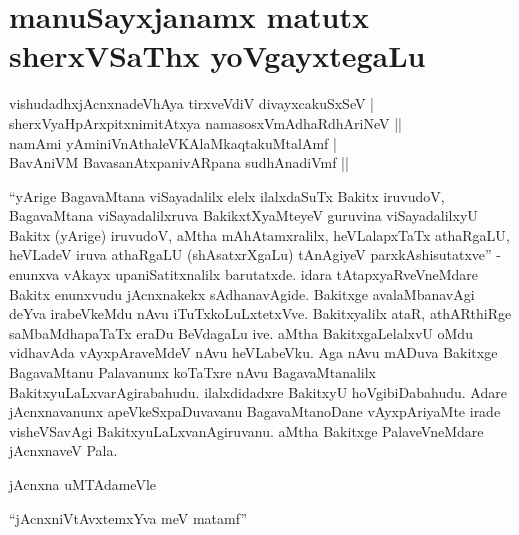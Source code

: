 \chapter{manuSayxjanamx matutx sherxVSaThx yoVgayxtegaLu}\label{chap9}

\begin{shloka}
vishudadhxjAcnxnadeVhAya tirxveVdiV divayxcakuSxSeV |\\
sherxVyaHpArxpitxnimitAtxya namasosxVmAdhaRdhAriNeV ||\\
namAmi yAminiVnAthaleVKAlaMkaqtakuMtalAmf |\\
BavAniVM BavasanAtxpanivARpana sudhAnadiVmf ||
\end{shloka}

``yArige BagavaMtana viSayadalilx elelx ilalxdaSuTx Bakitx iruvudoV, BagavaMtana viSayadalilxruva BakikxtXyaMteyeV guruvina viSayadalilxyU Bakitx (yArige) iruvudoV, aMtha mAhAtamxralilx, heVLalapxTaTx athaRgaLU, heVLadeV iruva athaRgaLU (shAsatxrXgaLu) tAnAgiyeV parxkAshisutatxve'' - enunxva vAkayx upaniSatitxnalilx barutatxde. idara tAtapxyaRveVneMdare Bakitx enunxvudu jAcnxnakekx sAdhanavAgide. Bakitxge avalaMbanavAgi deYva irabeVkeMdu nAvu iTuTxkoLuLxtetxVve. Bakitxyalilx ataR, athARthiRge saMbaMdhapaTaTx eraDu BeVdagaLu ive. aMtha BakitxgaLelalxvU oMdu vidhavAda vAyxpAraveMdeV nAvu heVLabeVku. Aga nAvu mADuva Bakitxge BagavaMtanu Palavanunx koTaTxre nAvu BagavaMtanalilx BakitxyuLaLxvarAgirabahudu. ilalxdidadxre BakitxyU hoVgibiDabahudu. Adare jAcnxnavanunx apeVkeSxpaDuvavanu BagavaMtanoDane vAyxpAriyaMte irade visheVSavAgi BakitxyuLaLxvanAgiruvanu. aMtha Bakitxge PalaveVneMdare jAcnxnaveV Pala.

jAcnxna uMTAdameVle

\begin{shloka}
``jAcnxniVtAvxtemxYva meV matamf''
\end{shloka}

